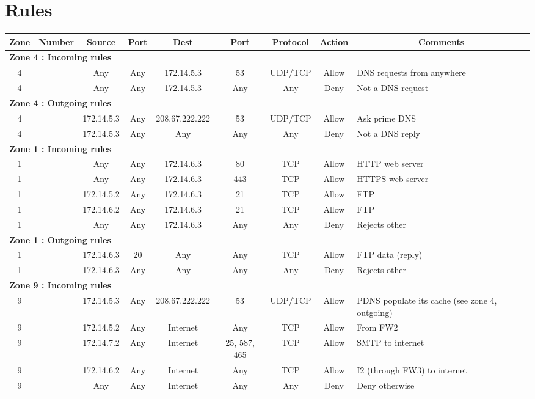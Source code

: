 \documentclass[a4paper,titlepage]{article}
\begin{document}
\section{Rules}
\label{sec:Rules}


\begin{table}[h]
	\center
	\begin{tabular}{c|c|cc|cc|ccl}
		Zone & Number & Source & Port & Dest & Port & Protocol & Action & \multicolumn{1}{c}{Comments}\\

		\hline
		\multicolumn{9}{l}{\textbf{Zone 4 : Incoming rules}}\\
		4 &  & Any & Any & 172.14.5.3 & 53 & UDP/TCP & Allow & DNS requests from anywhere\\
		4 &  & Any & Any & 172.14.5.3 & Any & Any & Deny & Not a DNS request\\

		\hline
		\multicolumn{9}{l}{\textbf{Zone 4 : Outgoing rules}}\\
		4 &  & 172.14.5.3 & Any & 208.67.222.222 & 53 & UDP/TCP & Allow & Ask prime DNS\\
		4 &  & 172.14.5.3 & Any & Any & Any & Any & Deny & Not a DNS reply\\

		\hline
		\multicolumn{9}{l}{\textbf{Zone 1 : Incoming rules}}\\
		1 &  & Any & Any & 172.14.6.3 & 80 & TCP & Allow & HTTP web server\\
		1 &  & Any & Any & 172.14.6.3 & 443 & TCP & Allow & HTTPS web server\\
		1 &  & 172.14.5.2 & Any & 172.14.6.3 & 21 & TCP & Allow & FTP\\
		1 &  & 172.14.6.2 & Any & 172.14.6.3 & 21 & TCP & Allow & FTP\\
		1 &  & Any & Any & 172.14.6.3 & Any & Any & Deny & Rejects other\\

		\hline
		\multicolumn{9}{l}{\textbf{Zone 1 : Outgoing rules}}\\
		1 & & 172.14.6.3 & 20 & Any & Any & TCP & Allow & FTP data (reply)\\
		1 & & 172.14.6.3 & Any & Any & Any & Any & Deny & Rejects other\\

		\hline
		\multicolumn{9}{l}{\textbf{Zone 9 : Incoming rules}}\\
		9 &  & 172.14.5.3 & Any & 208.67.222.222 & 53 & UDP/TCP & Allow & PDNS populate its cache (see zone 4, outgoing)\\
		9 &  & 172.14.5.2 & Any & Internet & Any & TCP & Allow & From FW2\\
		9 &  & 172.14.7.2 & Any & Internet & 25, 587, 465 & TCP & Allow & SMTP to internet\\
		9 &  & 172.14.6.2 & Any & Internet & Any & TCP & Allow & I2 (through FW3) to internet\\
		9 &  & Any & Any & Internet & Any & Any & Deny & Deny otherwise\\


\end{tabular}
\end{table}
\end{document}
